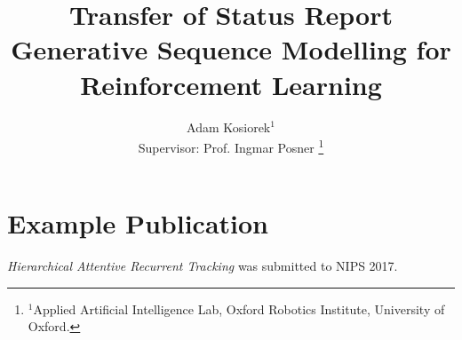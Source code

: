 \documentclass[a4paper, 12 pt, journal, onecolumn]{ieeeconf}
\title{\bf
	Transfer of Status Report\\
    Generative Sequence Modelling for\\ Reinforcement Learning
}
\author{%
    Adam Kosiorek$^{1}$\\
    Supervisor: Prof. Ingmar Posner
    \thanks{$^{1}$Applied Artificial Intelligence Lab, Oxford Robotics Institute,  University
  of Oxford.}
}
\begin{document}
\maketitle

%






%

\printbibliography

\appendix
\section{Example Publication}
\label{sec:app}
\emph{Hierarchical Attentive Recurrent Tracking} was submitted to NIPS 2017.

\end{document}
